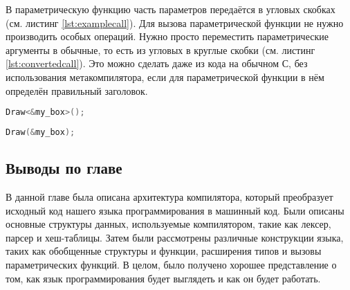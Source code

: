 В параметрическую функцию часть параметров передаётся в угловых скобках (см. листинг \ref{lst:examplecall}).
Для вызова параметрической функции не нужно производить особых операций.
Нужно просто переместить параметрические аргументы в обычные, то есть из угловых в круглые скобки (см. листинг \ref{lst:convertedcall}).
Это можно сделать даже из кода на обычном С, без использования метакомпилятора, если для параметрической функции в нём определён правильный заголовок.

\begin{lstlisting}[language=c, caption={Пример вызова параметрической функции}, label={lst:examplecall}]
  Draw<&my_box>();
\end{lstlisting}

\begin{lstlisting}[language=c, caption={Пример вызова параметрической функции, сконвертированный в С}, label={lst:convertedcall}]
  Draw(&my_box);
\end{lstlisting}

\subsection*{Выводы по главе}
В данной главе была описана архитектура компилятора, который преобразует исходный код нашего языка программирования в машинный код. Были описаны основные структуры данных, используемые компилятором, такие как лексер, парсер и хеш-таблицы.
Затем были рассмотрены различные конструкции языка, таких как обобщенные структуры и функции, расширения типов и вызовы параметрических функций.
В целом, было получено хорошее представление о том, как язык программирования будет выглядеть и как он будет работать.
